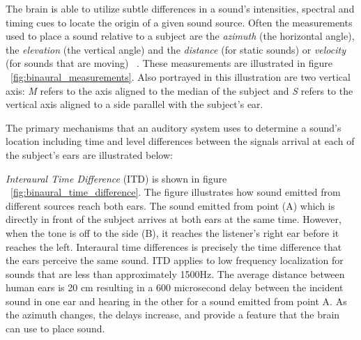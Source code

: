 The brain is able to utilize subtle differences in a sound's intensities,
spectral and timing cues to locate the origin of a given sound source.  Often
the measurements used to place a sound relative to a subject are the
\textit{azimuth} (the horizontal angle), the \textit{elevation} (the vertical
angle) and the \textit{distance} (for static sounds) or \textit{velocity} (for
sounds that are moving) ~\cite{shannan2010audiology}.  These measurements are
illustrated in figure ~\ref{fig:binaural_measurements}.  Also portrayed in this
illustration  are two vertical axis: \textit{M} refers to the axis aligned to
the median of the subject and \textit{S} refers to the vertical axis aligned to
a side parallel with the subject's ear.

The primary mechanisms that an auditory system uses to determine a sound's
location including time and level differences between the signals arrival at
each of the subject's ears  are illustrated below:

\textit{Interaural Time Difference} (ITD) is shown in figure
~\ref{fig:binaural_time_difference}. The figure illustrates how sound emitted
from different sources reach both ears. The sound emitted from point (A) which
is directly in front of the subject arrives at both ears at the same time.
However, when the tone is off to the side (B), it reaches the listener's right ear
before it reaches the left. Interaural time differences is precisely the time
difference that the ears perceive the same sound.  ITD applies to low frequency
localization for sounds that are less than approximately 1500Hz.  The average
distance between human ears is 20 cm resulting in a 600 microsecond delay between
the incident sound in one ear and hearing in the other for a sound emitted from
point A.  As the azimuth changes, the delays increase, and provide a feature
that the brain can use to place sound.


